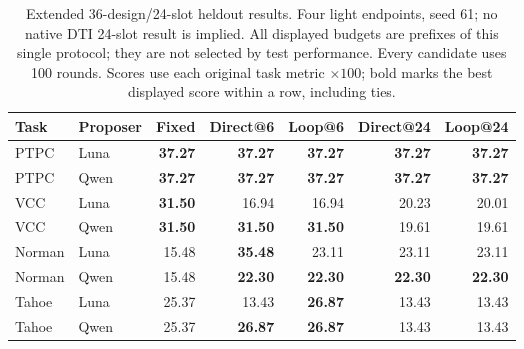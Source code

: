 \begin{table}[htbp]
\caption{Extended 36-design/24-slot heldout results. Four light endpoints, seed 61; no native DTI 24-slot result is implied. All displayed budgets are prefixes of this single protocol; they are not selected by test performance. Every candidate uses 100 rounds. Scores use each original task metric $\times100$; bold marks the best displayed score within a row, including ties.}
\label{tab:completed-long24}
\centering\small
\setlength{\tabcolsep}{4pt}
\begin{tabularx}{\linewidth}{@{}Xlrrrrr@{}}
\toprule
Task & Proposer & Fixed & Direct@6 & Loop@6 & Direct@24 & Loop@24 \\
\midrule
PTPC & Luna & \textbf{37.27} & \textbf{37.27} & \textbf{37.27} & \textbf{37.27} & \textbf{37.27} \\
PTPC & Qwen & \textbf{37.27} & \textbf{37.27} & \textbf{37.27} & \textbf{37.27} & \textbf{37.27} \\
VCC & Luna & \textbf{31.50} & 16.94 & 16.94 & 20.23 & 20.01 \\
VCC & Qwen & \textbf{31.50} & \textbf{31.50} & \textbf{31.50} & 19.61 & 19.61 \\
Norman & Luna & 15.48 & \textbf{35.48} & 23.11 & 23.11 & 23.11 \\
Norman & Qwen & 15.48 & \textbf{22.30} & \textbf{22.30} & \textbf{22.30} & \textbf{22.30} \\
Tahoe & Luna & 25.37 & 13.43 & \textbf{26.87} & 13.43 & 13.43 \\
Tahoe & Qwen & 25.37 & \textbf{26.87} & \textbf{26.87} & 13.43 & 13.43 \\
\bottomrule
\end{tabularx}
\end{table}
